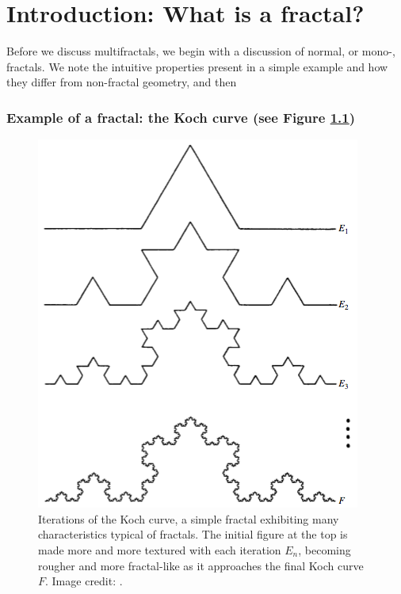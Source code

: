 
\chapter{Introduction: What is a fractal?} %

\label{Chapter1} %



Before we discuss multifractals, we begin with a discussion of normal, or mono-, fractals. We note the intuitive properties present in a simple example and how they differ from non-fractal geometry, and then 

\subsection{Example of a fractal: the Koch curve (see Figure \ref{fig:kochcurve})}\label{fractalexample}

\begin{figure}[h]
\centering
\includegraphics[height=0.6\textwidth]{Chapters/Figures/Kochcurve.png} 
\caption[Koch Curve]{Iterations of the Koch curve, a simple fractal exhibiting many characteristics typical of fractals. The initial figure at the top is made more and more textured with each iteration $E_{n}$, becoming rougher and more fractal-like as it approaches the final Koch curve $F$. Image credit: \citep{fractaltextbook}. }\label{fig:kochcurve}
\end{figure}

